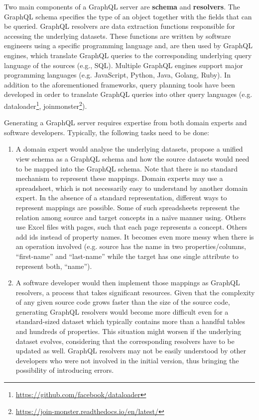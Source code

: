 Two main components of a GraphQL server are \textbf{schema} and \textbf{resolvers}.
The GraphQL schema specifies the type of an object together with the fields that can be queried. GraphQL resolvers are data extraction functions responsible for accessing the underlying datasets. These functions are written by software engineers using a  specific programming language and, are then used by GraphQL engines, which translate GraphQL queries to the corresponding underlying query language of the sources (e.g., SQL). Multiple GraphQL engines support major programming languages (e.g. JavaScript, Python, Java, Golang, Ruby). In addition to the aforementioned frameworks, query planning tools have been developed in order to translate GraphQL queries into other query languages (e.g. dataloader\footnote{\url{https://github.com/facebook/dataloader}}, joinmonster\footnote{\url{https://join-monster.readthedocs.io/en/latest/}}).

Generating a GraphQL server requires expertise from both domain experts and software developers. Typically, the following tasks need to be done: 
\begin{enumerate}
    \item A domain expert would analyse the underlying datasets, propose a unified view schema as a GraphQL schema and how the source datasets would need to be mapped into the GraphQL schema. Note that there is no standard mechanism to represent these mappings. Domain experts may use a spreadsheet, which is not necessarily easy to understand by another domain expert. In the absence of a standard representation, different ways to represent mappings are possible. Some of such spreadsheets represent the relation among source and target concepts in a na\"ive manner using. Others use Excel files with pages, such that each page represents a concept. Others add ids instead of property names.
    It becomes even more messy when there is an operation involved (e.g. source has the name in two properties/columns, ``first-name'' and ``last-name'' while the target has one single attribute to represent both, ``name'').
    \item A software developer would then implement those mappings as GraphQL resolvers, a process that takes significant resources. Given that the complexity of any given source code grows faster than the size of the source code, generating GraphQL resolvers would become more difficult even for a standard-sized dataset which typically contains more than a handful tables and hundreds of properties. This situation might worsen if the underlying dataset evolves, considering that the corresponding resolvers have to be updated as well. GraphQL resolvers may not be easily understood by other developers who were not involved in the initial version, thus bringing the possibility of introducing errors.
\end{enumerate}

